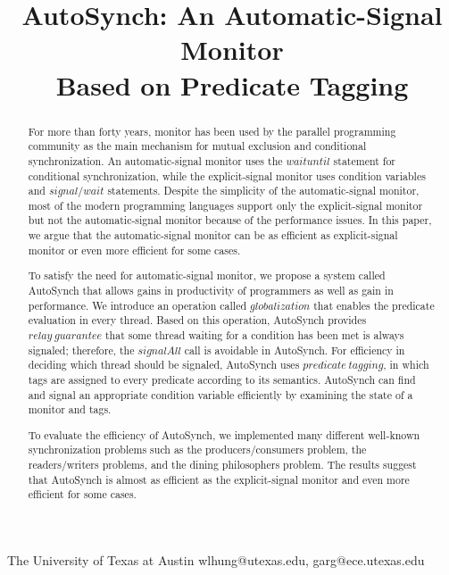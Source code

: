 \documentclass[preprint]{sigplanconf}
\begin{document}
\copyrightdata{[to be supplied]} 


\title{AutoSynch: An Automatic-Signal Monitor \\ Based on Predicate Tagging}
\subtitle{}

           {The University of Texas at Austin}
           {wlhung@utexas.edu, garg@ece.utexas.edu}

\maketitle

\begin{abstract}
For more than forty years, monitor has been used by the parallel programming 
community as the main mechanism for mutual exclusion and conditional 
synchronization. An 
automatic-signal monitor uses the $waituntil$ statement for conditional 
synchronization, while the explicit-signal monitor uses condition variables and 
$signal/wait$ statements. Despite the simplicity of the automatic-signal monitor, 
most of the modern programming languages support only the explicit-signal 
monitor but not the automatic-signal monitor because of the performance issues. 
In this paper, we argue that the automatic-signal monitor can be as efficient 
as explicit-signal monitor or even more efficient for some cases.

To satisfy the need for automatic-signal monitor, we propose a system called 
AutoSynch that allows gains in productivity of 
programmers as well as gain in performance. We introduce an operation called
$globalization$ that enables the predicate evaluation in
every thread. Based on this operation, AutoSynch provides $relay\ guarantee$
that some thread waiting for a condition has been met is always signaled; 
therefore, the $signalAll$ call is avoidable in AutoSynch. For efficiency in 
deciding which thread should be signaled, AutoSynch uses 
$predicate\ tagging$, in which tags are assigned to every predicate according
to its semantics. AutoSynch can find and signal an appropriate condition 
variable efficiently by examining the state of a monitor and tags. 

To evaluate the efficiency of AutoSynch, we implemented many different 
well-known synchronization problems such as the producers/consumers problem,
the readers/writers problems, and the dining philosophers problem. The results
suggest that AutoSynch is almost as efficient as the explicit-signal monitor
and even more efficient for some cases. 

\end{abstract}
\end{document}
